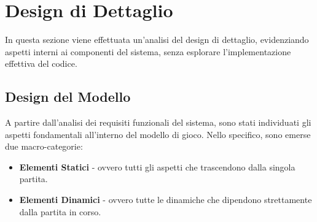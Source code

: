 \section{Design di Dettaglio}
In questa sezione viene effettuata un'analisi del design di dettaglio, evidenziando aspetti interni ai componenti del
sistema, senza esplorare l'implementazione effettiva del codice.

\subsection{Design del Modello}
A partire dall'analisi dei requisiti funzionali del sistema, sono stati individuati gli aspetti fondamentali all'interno
del modello di gioco. Nello specifico, sono emerse due macro-categorie:
\begin{itemize}
    \item \textbf{Elementi Statici} - ovvero tutti gli aspetti che trascendono dalla singola partita.
    \item \textbf{Elementi Dinamici} - ovvero tutte le dinamiche che dipendono strettamente dalla partita in corso.
\end{itemize}

